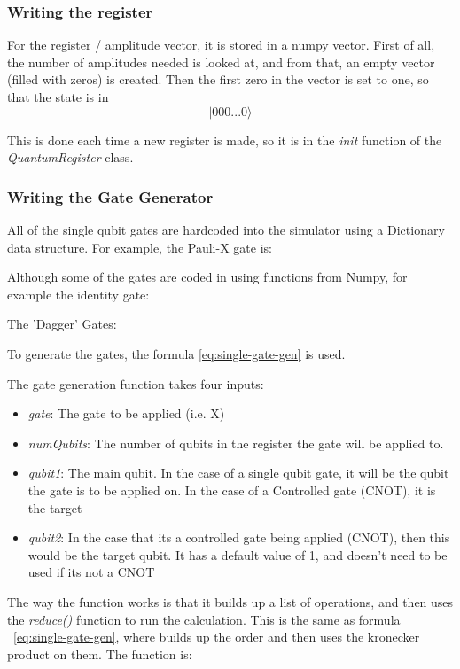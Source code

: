 \documentclass[../main.tex]{subfiles}
\begin{document}
\subsubsection{Writing the register}
For the register / amplitude vector, it is stored in a numpy vector.
First of all, the number of amplitudes needed is looked at, and from that, an empty vector (filled with zeros) is created. Then the first zero in the vector is set to one, so that the state is in 
$$
\lvert 000...0 \rangle
$$

This is done each time a new register is made, so it is in the \emph{init} function of the \emph{QuantumRegister} class.



\subsubsection{Writing the Gate Generator}
All of the single qubit gates are hardcoded into the simulator using a Dictionary data structure. For example, the Pauli-X gate is:

Although some of the gates are coded in using functions from Numpy, for example the identity gate:

The 'Dagger' Gates:


To generate the gates, the formula \ref{eq:single-gate-gen}
is used.

The gate generation function takes four inputs:
\begin{itemize}
	\item \emph{gate}: The gate to be applied (i.e. X)
	\item \emph{numQubits}: The number of qubits in the register the gate will be applied to.
	\item \emph{qubit1}: The main qubit. In the case of a single qubit gate, it will be the qubit the gate is to be applied on. In the case of a Controlled gate (CNOT), it is the target
	\item \emph{qubit2}: In the case that its a controlled gate being applied (CNOT), then this would be the target qubit. It has a default value of 1, and doesn't need to be used if its not a CNOT
\end{itemize}

The way the function works is that it builds up a list of operations, and then uses the \emph{reduce()} function to run the calculation. This is the same as formula ~\ref{eq:single-gate-gen}, where builds up the order and then uses the kronecker product on them. The function is:
\end{document}
